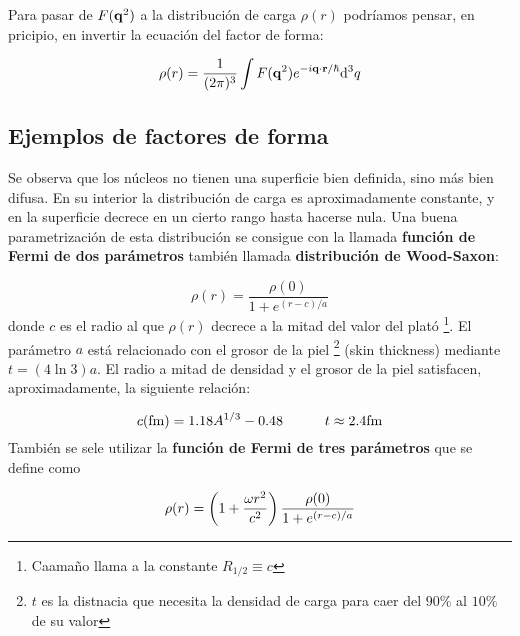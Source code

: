 Para pasar de $F(\mathbf{q}^2)$ a la distribución de carga $\rho(r)$ podríamos pensar, en pricipio, en invertir la ecuación del factor de forma:

\begin{equation}
    \rho(r)=\frac{1}{(2\pi)^3} \int F(\mathbf{q}^2) e^{-i \mathbf{q} \cdot \mathbf{r}/\hbar} \mathrm{d}^3 q
\end{equation}


\subsection{Ejemplos de factores de forma}


Se observa que los núcleos no tienen una superficie bien definida, sino más bien difusa. En su interior la distribución de carga es aproximadamente constante, y en la superficie decrece en un cierto rango hasta hacerse nula. Una buena parametrización de esta distribución se consigue con la llamada \textbf{función de Fermi de dos parámetros} también llamada \textbf{distribución de Wood-Saxon}:

\begin{equation}
    \rho (r) = \frac{\rho(0)}{1+e^{(r-c)/a}}
\end{equation}
donde $c$ es el radio al que $\rho(r)$ decrece a la mitad del valor del plató \footnote{Caamaño llama a la constante $R_{1/2}\equiv c$}. El parámetro $a$ está relacionado con el grosor de la piel \footnote{$t$ es la distnacia que necesita la densidad de carga para caer del $90\%$ al $10\%$ de su valor} (skin thickness) mediante $t=(4\ln 3)a$. El radio a mitad de densidad y el grosor de la piel satisfacen, aproximadamente, la siguiente relación:

\begin{equation}
    c(\unit{\fm}) = 1.18A^{1/3} - 0.48 \tquad t \approx 2.4 \unit{\fm}
\end{equation}
También se sele utilizar la \textbf{función de Fermi de tres parámetros} que se define como

\begin{equation}
    \rho (r) = \left( 1+ \frac{\omega r^2}{c^2} \right) \frac{\rho (0)}{1+e^{(r-c)/a}} 
\end{equation}



